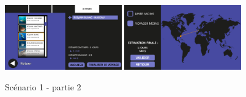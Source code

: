 \documentclass{article}
\begin{document}
\begin{figure}[!h]
	\includegraphics[width=0.45\textwidth]{assets/prototype/haute/Diapositive15}
	\hfill
	\includegraphics[width=0.45\textwidth]{assets/prototype/haute/Diapositive16}
	\caption{Scénario 1 - partie 2}
	\label{Scenario 1 - partie 2}
\end{figure}
\end{document}
